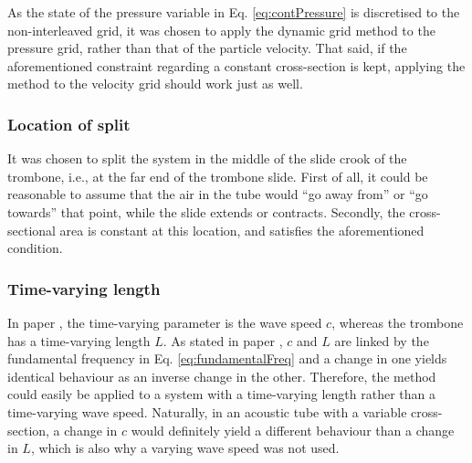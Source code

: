 As the state of the pressure variable in Eq. \eqref{eq:contPressure} is discretised to the non-interleaved grid, it was chosen to apply the dynamic grid method to the pressure grid, rather than that of the particle velocity. That said, if the aforementioned constraint regarding a constant cross-section is kept, applying the method to the velocity grid should work just as well.

\subsubsection{Location of split}
It was chosen to split the system in the middle of the slide crook of the trombone, i.e., at the far end of the trombone slide. First of all, it could be reasonable to assume that the air in the tube would ``go away from'' or ``go towards'' that point, while the slide extends or contracts. Secondly, the cross-sectional area is constant at this location, and satisfies the aforementioned condition.

\subsubsection{Time-varying length}
In paper \citeP[G], the time-varying parameter is the wave speed $c$, whereas the trombone has a time-varying length $L$. As stated in paper \citeP[G], $c$ and $L$ are linked by the fundamental frequency in Eq. \eqref{eq:fundamentalFreq} and a change in one yields identical behaviour as an inverse change in the other. Therefore, the method could easily be applied to a system with a time-varying length rather than a time-varying wave speed. Naturally, in an acoustic tube with a variable cross-section, a change in $c$ would definitely yield a different behaviour than a change in $L$, which is also why a varying wave speed was not used. 


